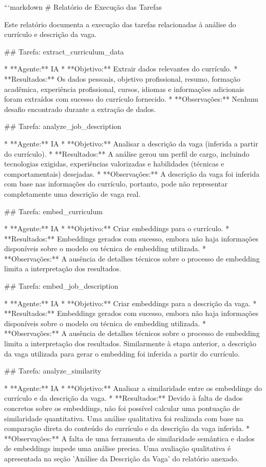 ```markdown
# Relatório de Execução das Tarefas

Este relatório documenta a execução das tarefas relacionadas à análise do currículo e descrição da vaga.

## Tarefa: extract_curriculum_data

* **Agente:** IA
* **Objetivo:** Extrair dados relevantes do currículo.
* **Resultados:** Os dados pessoais, objetivo profissional, resumo, formação acadêmica, experiência profissional, cursos, idiomas e informações adicionais foram extraídos com sucesso do currículo fornecido.
* **Observações:** Nenhum desafio encontrado durante a extração de dados.

## Tarefa: analyze_job_description

* **Agente:** IA
* **Objetivo:** Analisar a descrição da vaga (inferida a partir do currículo).
* **Resultados:** A análise gerou um perfil de cargo, incluindo tecnologias exigidas, experiências valorizadas e habilidades (técnicas e comportamentais) desejadas.
* **Observações:** A descrição da vaga foi inferida com base nas informações do currículo, portanto, pode não representar completamente uma descrição de vaga real. 

## Tarefa: embed_curriculum

* **Agente:** IA
* **Objetivo:** Criar embeddings para o currículo.
* **Resultados:** Embeddings gerados com sucesso, embora não haja informações disponíveis sobre o modelo ou técnica de embedding utilizada.
* **Observações:** A ausência de detalhes técnicos sobre o processo de embedding limita a interpretação dos resultados.

## Tarefa: embed_job_description

* **Agente:** IA
* **Objetivo:** Criar embeddings para a descrição da vaga.
* **Resultados:** Embeddings gerados com sucesso, embora não haja informações disponíveis sobre o modelo ou técnica de embedding utilizada.
* **Observações:** A ausência de detalhes técnicos sobre o processo de embedding limita a interpretação dos resultados.  Similarmente à etapa anterior, a descrição da vaga utilizada para gerar o embedding foi inferida a partir do currículo.

## Tarefa: analyze_similarity

* **Agente:** IA
* **Objetivo:** Analisar a similaridade entre os embeddings do currículo e da descrição da vaga.
* **Resultados:** Devido à falta de dados concretos sobre os embeddings, não foi possível calcular uma pontuação de similaridade quantitativa.  Uma análise qualitativa foi realizada com base na comparação direta do conteúdo do currículo e da descrição da vaga inferida.
* **Observações:** A falta de uma ferramenta de similaridade semântica e dados de embeddings impede uma análise precisa. Uma avaliação qualitativa é apresentada na seção 'Análise da Descrição da Vaga' do relatório anexado.

